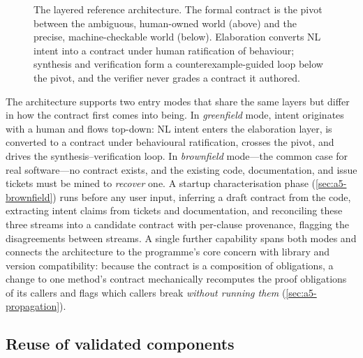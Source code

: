 \begin{figure}[t]
  \caption{The layered reference architecture. The formal contract is the pivot between the ambiguous, human-owned world (above) and the precise, machine-checkable world (below). Elaboration converts NL intent into a contract under human ratification of behaviour; synthesis and verification form a counterexample-guided loop below the pivot, and the verifier never grades a contract it authored.}
  \label{fig:a5-layers}
\end{figure}

The architecture supports two entry modes that share the same layers but differ in how the contract first comes into being. In \emph{greenfield} mode, intent originates with a human and flows top-down: NL intent enters the elaboration layer, is converted to a contract under behavioural ratification, crosses the pivot, and drives the synthesis--verification loop. In \emph{brownfield} mode---the common case for real software---no contract exists, and the existing code, documentation, and issue tickets must be mined to \emph{recover} one. A startup characterisation phase (\cref{sec:a5-brownfield}) runs before any user input, inferring a draft contract from the code, extracting intent claims from tickets and documentation, and reconciling these three streams into a candidate contract with per-clause provenance, flagging the disagreements between streams. A single further capability spans both modes and connects the architecture to the programme's core concern with library and version compatibility: because the contract is a composition of obligations, a change to one method's contract mechanically recomputes the proof obligations of its callers and flags which callers break \emph{without running them} (\cref{sec:a5-propagation}).

\subsection{Reuse of validated components}\label{subsec:a5-reuse}

